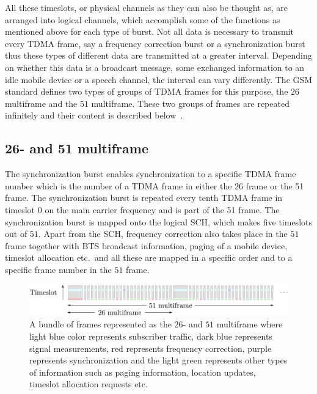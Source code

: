 All these timeslots, or physical channels as they can also be thought
as, are arranged into logical channels, which accomplish some of the
functions as mentioned above for each type of burst. Not all data is
necessary to transmit every TDMA frame, say a frequency correction
burst or a synchronization burst thus these types of different data
are transmitted at a greater interval. Depending on whether this data
is a broadcast message, some exchanged information to an idle mobile
device or a speech channel, the interval can vary differently. The
\gls{GSM} standard defines two types of groups of \gls{TDMA} frames
for this purpose, the $26$ multiframe and the $51$ multiframe. These
two groups of frames are repeated infinitely and their content is
described below~\cite[p. 27]{gsmtolte}.

\subsection{26- and 51 multiframe}
\label{sec:2651multiframe}
The synchronization burst enables synchronization to a specific
\gls{TDMA} frame number which is the number of a \gls{TDMA} frame in
either the 26 frame or the 51 frame. The synchronization burst is
repeated every tenth \gls{TDMA} frame in timeslot $0$ on the main
carrier frequency and is part of the 51 frame. The synchronization
burst is mapped onto the logical \gls{SCH}, which makes five timeslots
out of $51$. Apart from the \gls{SCH}, frequency correction also takes
place in the $51$ frame together with \gls{BTS} broadcast information,
paging of a mobile device, timeslot allocation etc.\ and all these are
mapped in a specific order and to a specific frame number in the $51$
frame.

\begin{figure}[H]
  \centering
  \includegraphics[width=\textwidth]{figures/2651frame}
  \caption{A bundle of frames represented as the $26$- and $51$
    multiframe where light blue color represents subscriber traffic,
    dark blue represents signal measurements, red represents frequency
    correction, purple represents synchronization and the light green
    represents other types of information such as paging information,
    location updates, timeslot allocation requests etc.}
  \label{fig:2651frame}
\end{figure}

